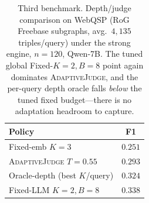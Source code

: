 \begin{table}[tb]
\centering
\caption{Third benchmark. Depth/judge comparison on WebQSP (RoG Freebase subgraphs, avg.\ $4{,}135$ triples/query) under the strong engine, $n{=}120$, Qwen-7B. The tuned global Fixed-$K{=}2,B{=}8$ point again dominates \textsc{AdaptiveJudge}, and the per-query depth oracle falls \emph{below} the tuned fixed budget---there is no adaptation headroom to capture.}
\label{tab:webqsp}
\small
\begin{tabular}{lc}
\toprule
Policy & F1 \\
\midrule
Fixed-emb $K{=}3$            & $0.251$ \\
\textsc{AdaptiveJudge} $T{=}0.55$ & $0.293$ \\
Oracle-depth (best $K$/query) & $0.324$ \\
Fixed-LLM $K{=}2,B{=}8$      & $\mathbf{0.338}$ \\
\bottomrule
\end{tabular}
\end{table}
